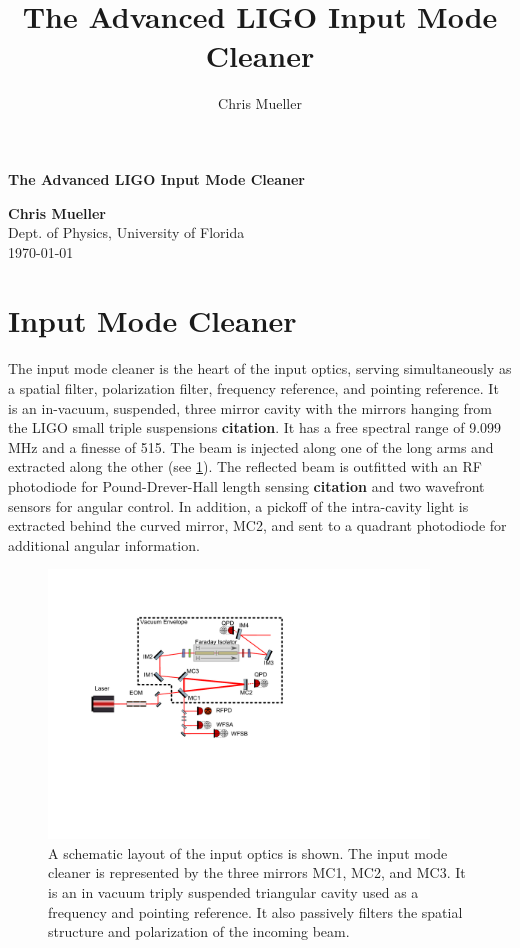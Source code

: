 \documentclass[10pt]{article}
\title{The Advanced LIGO Input Mode Cleaner}
\author{Chris Mueller}
\begin{document}
\begin{large}
\begin{center}
\begin{LARGE}
\textbf{The Advanced LIGO Input Mode Cleaner}\\
\end{LARGE}
\vspace{0.50in}
\textbf{Chris Mueller} \\
Dept. of Physics, University of Florida\\
\today
\end{center}
\end{large}
\vspace{1pc}
\tableofcontents
\pagebreak[4]

\section{Input Mode Cleaner}

The input mode cleaner is the heart of the input optics, serving simultaneously as a spatial filter, 
polarization filter, frequency reference, and pointing reference.  
It is an in-vacuum, suspended, three mirror cavity with the mirrors hanging from the LIGO small triple 
suspensions \textbf{citation}.  
It has a free spectral range of 9.099 MHz and a finesse of 515.  
The beam is injected along one of the long arms and extracted along the other (see \ref{fig:ioAll}).  
The reflected beam is outfitted with an RF photodiode for Pound-Drever-Hall length sensing \textbf{citation} 
and two wavefront sensors for angular control.  
In addition, a pickoff of the intra-cavity light is extracted behind the curved mirror, MC2, and sent to a 
quadrant photodiode for additional angular information.  

\begin{figure}
	\centering
	\includegraphics[width=0.9\textwidth, trim=3.5cm 7.5cm 11cm 3.5cm]{IO_Drawing.pdf}
	\caption{A schematic layout of the input optics is shown.  
		The input mode cleaner is represented by the three mirrors MC1, MC2, and MC3.  
		It is an in vacuum triply suspended triangular cavity used as a frequency 
		and pointing reference.  It also passively filters the spatial structure 
		and polarization of the incoming beam.}
	\label{fig:ioAll}
\end{figure}		
\end{document}
